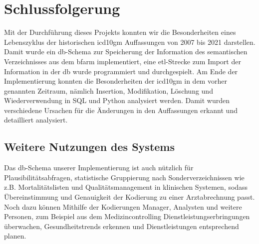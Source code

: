 \chapter{Schlussfolgerung} \label{ch:conclusion}

Mit der Durchführung dieses Projekts konnten wir die Besonderheiten eines Lebenszyklus der historischen \ac{icd10gm} Auffassungen von 2007 bis 2021 darstellen. Damit wurde ein \ac{db}-Schema zur Speicherung der Information des semantischen Verzeichnisses aus dem \ac{bfarm} implementiert, eine \ac{etl}-Strecke zum Import der Information in der \ac{db} wurde programmiert und durchgespielt. Am Ende der Implementierung konnten die Besonderheiten der \ac{icd10gm} in dem vorher genannten Zeitraum, nämlich Insertion, Modifikation, Löschung und Wiederverwendung in SQL und Python analysiert werden. Damit wurden verschiedene Ursachen für die Änderungen in den Auffassungen erkannt und detailliert analysiert.

\section{Weitere Nutzungen des Systems} \label{sec:future}

Das \ac{db}-Schema unserer Implementierung ist auch nützlich für Plausibilitätsabfragen, statistische Gruppierung nach Sonderverzeichnissen wie z.B. Mortalitätslisten und Qualitätsmanagement in klinischen Systemen, sodass Übereinstimmung und Genauigkeit der Kodierung zu einer Arztabrechnung passt. Noch dazu können Mithilfe der Kodierungen Manager, Analysten und weitere Personen, zum Beispiel aus dem Medizincontrolling Dienstleistungserbringungen überwachen, Gesundheitstrends erkennen und Dienstleistungen entsprechend planen.
